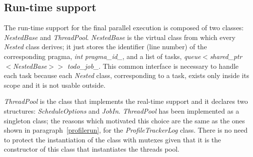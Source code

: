\documentclass[a4paper,11pt,oneside]{book}
\begin{document}

\subsection{Run-time support}
\label{runtime}
The run-time support for the final parallel execution is composed of two classes: \emph{NestedBase} and \emph{ThreadPool}. \emph{NestedBase} is the virtual class from which every \emph{Nested} class derives; it just stores the identifier (line number) of the corresponding pragma, \emph{int pragma\_id\_}, and a list of tasks, \emph{queue$<$shared\_ptr$<$NestedBase$>>$ todo\_job\_}. This common interface is necessary to handle each task because each \emph{Nested} class, corresponding to a task, exists only inside its scope and it is not usable outside.   

\emph{ThreadPool} is the class that implements the real-time support and it declares two structures: \emph{ScheduleOptions} and \emph{JobIn}. \emph{ThreadPool} has been implemented as a singleton class; the reasons which motivated this choice are the same as the ones shown in paragraph~\ref{profilerun}, for the \emph{ProfileTrackerLog} class. There is no need to protect the instantiation of the class with mutexes given that it is the constructor of this class that instantiates the threads pool.
\end{document}
